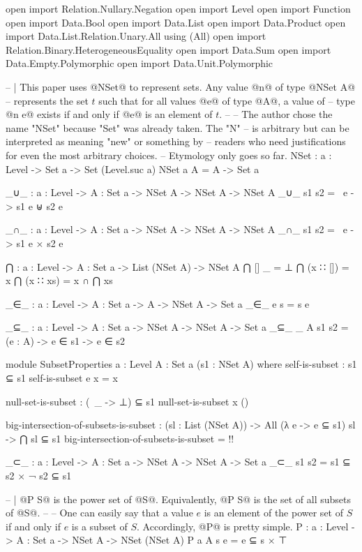 \begin{code}
open import Relation.Nullary.Negation
open import Level
open import Function
open import Data.Bool
open import Data.List
open import Data.Product
open import Data.List.Relation.Unary.All using (All)
open import Relation.Binary.HeterogeneousEquality
open import Data.Sum
open import Data.Empty.Polymorphic
open import Data.Unit.Polymorphic

-- | This paper uses @NSet@ to represent sets.  Any value @n@ of type @NSet A@
-- represents the set \(t\) such that for all values @e@ of type @A@, a value of
-- type @n e@ exists if and only if @e@ is an element of \(t\).
--
-- The author chose the name "NSet" because "Set" was already taken.  The "N"
-- is arbitrary but can be interpreted as meaning "new" or something by
-- readers who need justifications for even the most arbitrary choices.
-- Etymology only goes so far.
NSet : {a : Level} -> Set a -> Set (Level.suc a)
NSet {a} A = A -> Set a

_∪_ : {a : Level} -> {A : Set a} -> NSet A -> NSet A -> NSet A
_∪_ s1 s2 = \ e -> s1 e ⊎ s2 e

_∩_ : {a : Level} -> {A : Set a} -> NSet A -> NSet A -> NSet A
_∩_ s1 s2 = \ e -> s1 e × s2 e

⋂ : {a : Level} -> {A : Set a} -> List (NSet A) -> NSet A
⋂ [] _ = ⊥
⋂ (x ∷ []) = x
⋂ (x ∷ xs) = x ∩ ⋂ xs

_∈_ : {a : Level} -> {A : Set a} -> A -> NSet A -> Set a
_∈_ e s = s e

_⊆_ : {a : Level} -> {A : Set a} -> NSet A -> NSet A -> Set a
_⊆_ {_} {A} s1 s2 = (e : A) -> e ∈ s1 -> e ∈ s2

module SubsetProperties {a : Level} {A : Set a} (s1 : NSet A) where
  self-is-subset : s1 ⊆ s1
  self-is-subset e x = x

  null-set-is-subset : (\ _ -> ⊥) ⊆ s1
  null-set-is-subset x ()

  big-intersection-of-subsets-is-subset :
    (sl : List (NSet A)) ->
    All (λ e -> e ⊆ s1) sl ->
    ⋂ sl ⊆ s1
  big-intersection-of-subsets-is-subset = {!!}

_⊂_ : {a : Level} -> {A : Set a} -> NSet A -> NSet A -> Set a
_⊂_ s1 s2 = s1 ⊆ s2 × ¬ s2 ⊆ s1

-- | @P S@ is the power set of @S@.  Equivalently, @P S@ is the set of all subsets of @S@.
--
-- One can easily say that a value \(e\) is an element of the power set of \(S\) if and only if \(e\) is a subset of \(S\).  Accordingly, @P@ is pretty simple.
P : {a : Level} -> {A : Set a} -> NSet A -> NSet (NSet A)
P {a} {A} s e = e ⊆ s × ⊤


\end{code}
